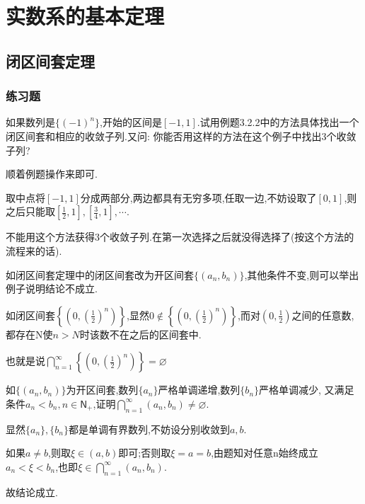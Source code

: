 \documentclass[cn,chinese,fontset]{elegantbook}
\begin{document}
\tableofcontents

    \chapter{实数系的基本定理}
        \section{闭区间套定理}
            \subsection{练习题}
            \begin{exercise}
                如果数列是$\{(-1)^n\}$,开始的区间是$[-1,1]$.试用例题3.2.2中的方法具体找出一个闭区间套和相应的收敛子列.又问: 你能否用这样的方法在这个例子中找出3个收敛子列?
            \end{exercise}
            \begin{solution}
                顺着例题操作来即可.

                取中点将$[-1,1]$分成两部分,两边都具有无穷多项,任取一边,不妨设取了$[0,1]$,则之后只能取$[\frac{1}{2},1],[\frac{3}{4},1],\cdots$.

                不能用这个方法获得3个收敛子列.在第一次选择之后就没得选择了(按这个方法的流程来的话).
            \end{solution}

            \begin{exercise}
                如闭区间套定理中的闭区间套改为开区间套$\{(a_n,b_n)\}$,其他条件不变,则可以举出例子说明结论不成立.
            \end{exercise}
            \begin{solution}
                如闭区间套$\left\{(0,(\frac{1}{2})^n)\right\}$,显然$0\notin\left\{(0,(\frac{1}{2})^n)\right\}$,而对$(0,\frac{1}{2})$之间的任意数,都存在N使$n>N$时该数不在之后的区间套中.

                也就是说$\textstyle\bigcap_{n=1}^\infty\left\{(0,(\frac{1}{2})^n)\right\}=\varnothing $
            \end{solution}

            \begin{exercise}
                如$\{(a_n,b_n)\}$为开区间套,数列$\{a_n\}$严格单调递增,数列$\{b_n\}$严格单调减少,
                又满足条件$a_n<b_n,n\in \mathsf{N}_+$,证明$\textstyle\bigcap_{n=1}^\infty(a_n,b_n)\neq\varnothing$.
            \end{exercise}
            \begin{solution}
                显然$\{a_n\},\{b_n\}$都是单调有界数列,不妨设分别收敛到$a,b$.

                如果$a\neq b$,则取$\xi \in (a,b)$即可;否则取$\xi=a=b$,由题知对任意n始终成立$a_n<\xi<b_n$,也即$\xi\in\textstyle\bigcap_{n=1}^\infty(a_n,b_n)$.

                故结论成立.
            \end{solution}
\end{document}
